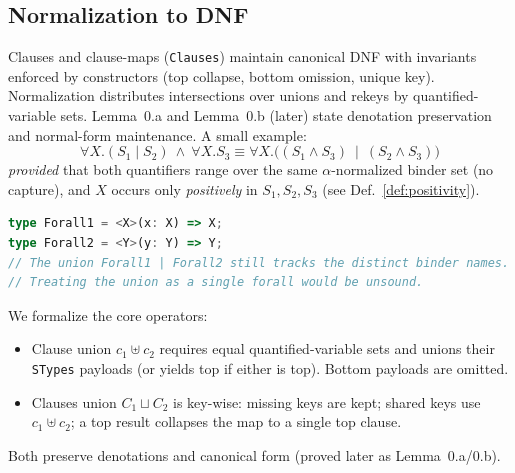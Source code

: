 \documentclass[11pt]{article}
\begin{document}
\subsection{Normalization to DNF}
Clauses and clause-maps (\texttt{Clauses}) maintain canonical DNF with invariants enforced by constructors (top collapse, bottom omission, unique key). Normalization distributes intersections over unions and rekeys by quantified-variable sets. Lemma~0.a and Lemma~0.b (later) state denotation preservation and normal-form maintenance. A small example:
\[
\forall X.(S_1 \mid S_2)~\wedge~\forall X.S_3 
\equiv \forall X.\big((S_1 \wedge S_3)~\mid~(S_2 \wedge S_3)\big)
\]
\emph{provided} that both quantifiers range over the same $\alpha$-normalized binder set (no capture), and $X$ occurs only \emph{positively} in $S_1,S_2,S_3$ (see Def.~\ref{def:positivity}).
\begin{lstlisting}[language=TypeScript]
type Forall1 = <X>(x: X) => X;
type Forall2 = <Y>(y: Y) => Y;
// The union Forall1 | Forall2 still tracks the distinct binder names.
// Treating the union as a single forall would be unsound.
\end{lstlisting}

We formalize the core operators:
\begin{itemize}[leftmargin=*]
  \item Clause union $c_1 \uplus c_2$ requires equal quantified-variable sets and unions their \texttt{STypes} payloads (or yields top if either is top). Bottom payloads are omitted.
  \item Clauses union $C_1 \sqcup C_2$ is key-wise: missing keys are kept; shared keys use $c_1 \uplus c_2$; a top result collapses the map to a single top clause.
\end{itemize}
Both preserve denotations and canonical form (proved later as Lemma~0.a/0.b).
\end{document}
